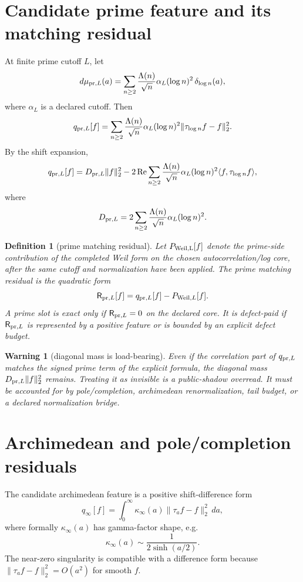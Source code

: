 \documentclass[11pt]{article}
\newtheorem{definition}{Definition}
\newtheorem{warning}{Warning}
\newcommand{\R}{\mathsf R}
\begin{document}
\section{Candidate prime feature and its matching residual}
At finite prime cutoff \(L\), let
\[
  d\mu_{{\rm pr},L}(a)=\sum_{n\ge2} \frac{\Lambda(n)}{\sqrt n}\alpha_L(\log n)^2\,\delta_{\log n}(a),
\]
where \(\alpha_L\) is a declared cutoff.  Then
\[
  q_{{\rm pr},L}[f]=\sum_{n\ge2}\frac{\Lambda(n)}{\sqrt n}\alpha_L(\log n)^2\|\tau_{\log n}f-f\|_2^2.
\]
By the shift expansion,
\[
  q_{{\rm pr},L}[f]=D_{{\rm pr},L}\|f\|_2^2-2\operatorname{Re}\sum_{n\ge2}\frac{\Lambda(n)}{\sqrt n}\alpha_L(\log n)^2\langle f,\tau_{\log n}f\rangle,
\]
where
\[
  D_{{\rm pr},L}=2\sum_{n\ge2}\frac{\Lambda(n)}{\sqrt n}\alpha_L(\log n)^2.
\]

\begin{definition}[prime matching residual]
Let \(P_{\rm Weil,L}[f]\) denote the prime-side contribution of the completed Weil form on the chosen autocorrelation/log core, after the same cutoff and normalization have been applied.  The prime matching residual is the quadratic form
\[
  \R_{{\rm pr},L}[f]
  =q_{{\rm pr},L}[f]-P_{{\rm Weil},L}[f].
\]
A prime slot is exact only if \(\R_{{\rm pr},L}=0\) on the declared core.  It is defect-paid if \(\R_{{\rm pr},L}\) is represented by a positive feature or is bounded by an explicit defect budget.
\end{definition}

\begin{warning}[diagonal mass is load-bearing]
Even if the correlation part of \(q_{{\rm pr},L}\) matches the signed prime term of the explicit formula, the diagonal mass \(D_{{\rm pr},L}\|f\|_2^2\) remains.  Treating it as invisible is a public-shadow overread.  It must be accounted for by pole/completion, archimedean renormalization, tail budget, or a declared normalization bridge.
\end{warning}

\section{Archimedean and pole/completion residuals}
The candidate archimedean feature is a positive shift-difference form
\[
  q_\infty[f]=\int_0^\infty \kappa_\infty(a)\|\tau_a f-f\|_2^2\,da,
\]
where formally \(\kappa_\infty(a)\) has gamma-factor shape, e.g.
\[
  \kappa_\infty(a)\sim \frac{1}{2\sinh(a/2)}.
\]
The near-zero singularity is compatible with a difference form because \(\|\tau_a f-f\|_2^2=O(a^2)\) for smooth \(f\).
\end{document}
